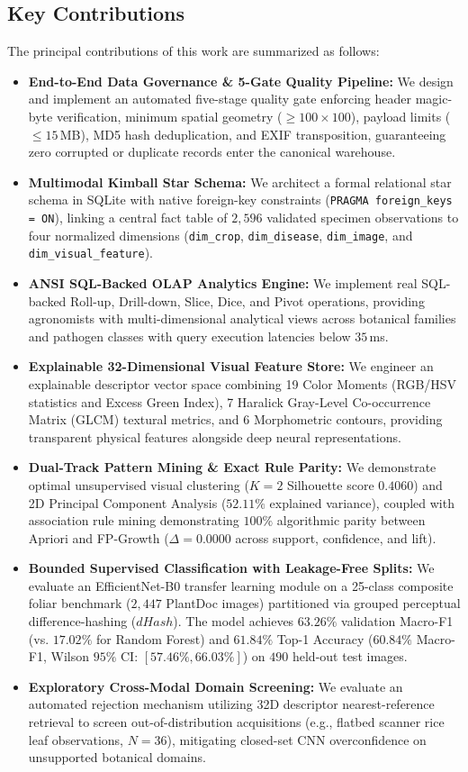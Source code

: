 \documentclass[conference,a4paper]{IEEEtran}
\begin{document}
\subsection{Key Contributions}
The principal contributions of this work are summarized as follows:
\begin{itemize}
    \item \textbf{End-to-End Data Governance \& 5-Gate Quality Pipeline:} We design and implement an automated five-stage quality gate enforcing header magic-byte verification, minimum spatial geometry ($\ge 100\times 100$), payload limits ($\le 15$\,MB), MD5 hash deduplication, and EXIF transposition, guaranteeing zero corrupted or duplicate records enter the canonical warehouse.
    \item \textbf{Multimodal Kimball Star Schema:} We architect a formal relational star schema in SQLite with native foreign-key constraints (\texttt{PRAGMA foreign\_keys = ON}), linking a central fact table of $2,596$ validated specimen observations to four normalized dimensions (\texttt{dim\_crop}, \texttt{dim\_disease}, \texttt{dim\_image}, and \texttt{dim\_visual\_feature}).
    \item \textbf{ANSI SQL-Backed OLAP Analytics Engine:} We implement real SQL-backed Roll-up, Drill-down, Slice, Dice, and Pivot operations, providing agronomists with multi-dimensional analytical views across botanical families and pathogen classes with query execution latencies below $35$\,ms.
    \item \textbf{Explainable 32-Dimensional Visual Feature Store:} We engineer an explainable descriptor vector space combining 19 Color Moments (RGB/HSV statistics and Excess Green Index), 7 Haralick Gray-Level Co-occurrence Matrix (GLCM) textural metrics, and 6 Morphometric contours, providing transparent physical features alongside deep neural representations.
    \item \textbf{Dual-Track Pattern Mining \& Exact Rule Parity:} We demonstrate optimal unsupervised visual clustering ($K=2$ Silhouette score $0.4060$) and 2D Principal Component Analysis ($52.11\%$ explained variance), coupled with association rule mining demonstrating $100\%$ algorithmic parity between Apriori and FP-Growth ($\Delta = 0.0000$ across support, confidence, and lift).
    \item \textbf{Bounded Supervised Classification with Leakage-Free Splits:} We evaluate an EfficientNet-B0 transfer learning module on a 25-class composite foliar benchmark ($2,447$ PlantDoc images) partitioned via grouped perceptual difference-hashing ($dHash$). The model achieves $63.26\%$ validation Macro-F1 (vs. $17.02\%$ for Random Forest) and $61.84\%$ Top-1 Accuracy ($60.84\%$ Macro-F1, Wilson $95\%$ CI: $[57.46\%, 66.03\%]$) on $490$ held-out test images.
    \item \textbf{Exploratory Cross-Modal Domain Screening:} We evaluate an automated rejection mechanism utilizing 32D descriptor nearest-reference retrieval to screen out-of-distribution acquisitions (e.g., flatbed scanner rice leaf observations, $N=36$), mitigating closed-set CNN overconfidence on unsupported botanical domains.
\end{itemize}
\end{document}
